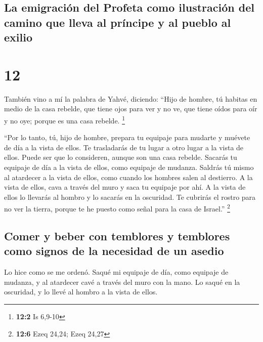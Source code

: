 \hypertarget{la-emigraciuxf3n-del-profeta-como-ilustraciuxf3n-del-camino-que-lleva-al-pruxedncipe-y-al-pueblo-al-exilio}{%
\subsection{La emigración del Profeta como ilustración del camino que
lleva al príncipe y al pueblo al
exilio}\label{la-emigraciuxf3n-del-profeta-como-ilustraciuxf3n-del-camino-que-lleva-al-pruxedncipe-y-al-pueblo-al-exilio}}

\hypertarget{section-11}{%
\section{12}\label{section-11}}

 También vino a mí la palabra de Yahvé, diciendo:
 ``Hijo de hombre, tú habitas en medio de la casa rebelde,
que tiene ojos para ver y no ve, que tiene oídos para oír y no oye;
porque es una casa rebelde. \footnote{\textbf{12:2} Is 6,9-10}

 ``Por lo tanto, tú, hijo de hombre, prepara tu equipaje
para mudarte y muévete de día a la vista de ellos. Te trasladarás de tu
lugar a otro lugar a la vista de ellos. Puede ser que lo consideren,
aunque son una casa rebelde.  Sacarás tu equipaje de día a
la vista de ellos, como equipaje de mudanza. Saldrás tú mismo al
atardecer a la vista de ellos, como cuando los hombres salen al
destierro.  A la vista de ellos, cava a través del muro y
saca tu equipaje por ahí.  A la vista de ellos lo llevarás
al hombro y lo sacarás en la oscuridad. Te cubrirás el rostro para no
ver la tierra, porque te he puesto como señal para la casa de Israel.''
\footnote{\textbf{12:6} Ezeq 24,24; Ezeq 24,27}

\hypertarget{comer-y-beber-con-temblores-y-temblores-como-signos-de-la-necesidad-de-un-asedio}{%
\subsection{Comer y beber con temblores y temblores como signos de la
necesidad de un
asedio}\label{comer-y-beber-con-temblores-y-temblores-como-signos-de-la-necesidad-de-un-asedio}}

 Lo hice como se me ordenó. Saqué mi equipaje de día, como
equipaje de mudanza, y al atardecer cavé a través del muro con la mano.
Lo saqué en la oscuridad, y lo llevé al hombro a la vista de ellos.

